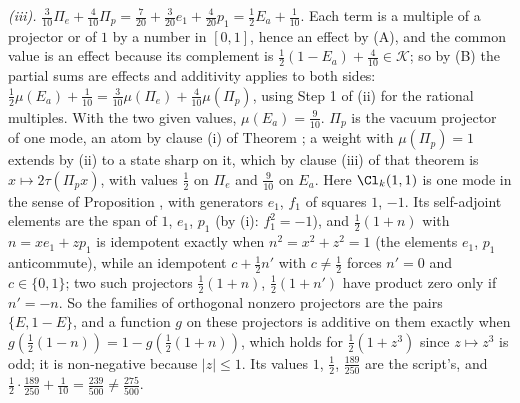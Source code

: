 \emph{(iii).} $\tfrac{3}{10}\Pi_{e} + \tfrac{4}{10}\Pi_{p} = \tfrac{7}{20} + \tfrac{3}{20}e_{1} + \tfrac{4}{20}p_{1} = \tfrac12E_{a} + \tfrac{1}{10}$. Each term is a multiple of a projector or of $1$ by a number in $[0,1]$, hence an effect by (A), and the common value is an effect because its complement is $\tfrac12(1 - E_{a}) + \tfrac{4}{10} \in \mathcal{K}$; so by (B) the partial sums are effects and additivity applies to both sides: $\tfrac12\mu(E_{a}) + \tfrac{1}{10} = \tfrac{3}{10}\mu(\Pi_{e}) + \tfrac{4}{10}\mu(\Pi_{p})$, using Step 1 of (ii) for the rational multiples. With the two given values, $\mu(E_{a}) = \tfrac{9}{10}$. $\Pi_{p}$ is the vacuum projector of one mode, an atom by clause (i) of Theorem ; a weight with $\mu(\Pi_{p}) = 1$ extends by (ii) to a state sharp on it, which by clause (iii) of that theorem is $x \mapsto 2\tau(\Pi_{p}x)$, with values $\tfrac12$ on $\Pi_{e}$ and $\tfrac{9}{10}$ on $E_{a}$. Here $\Cl_{k}(1,1)$ is one mode in the sense of Proposition , with generators $e_{1}$, $f_{1}$ of squares $1$, $-1$. Its self-adjoint elements are the span of $1$, $e_{1}$, $p_{1}$ (by (i): $f_{1}^{2} = -1$), and $\tfrac12(1 + n)$ with $n = xe_{1} + zp_{1}$ is idempotent exactly when $n^{2} = x^{2} + z^{2} = 1$ (the elements $e_{1}$, $p_{1}$ anticommute), while an idempotent $c + \tfrac12 n'$ with $c \ne \tfrac12$ forces $n' = 0$ and $c \in \{0, 1\}$; two such projectors $\tfrac12(1 + n)$, $\tfrac12(1 + n')$ have product zero only if $n' = -n$. So the families of orthogonal nonzero projectors are the pairs $\{E, 1 - E\}$, and a function $g$ on these projectors is additive on them exactly when $g(\tfrac12(1 - n)) = 1 - g(\tfrac12(1 + n))$, which holds for $\tfrac12(1 + z^{3})$ since $z \mapsto z^{3}$ is odd; it is non-negative because $|z| \le 1$. Its values $1$, $\tfrac12$, $\tfrac{189}{250}$ are the script's, and $\tfrac12 \cdot \tfrac{189}{250} + \tfrac{1}{10} = \tfrac{239}{500} \ne \tfrac{275}{500}$.

